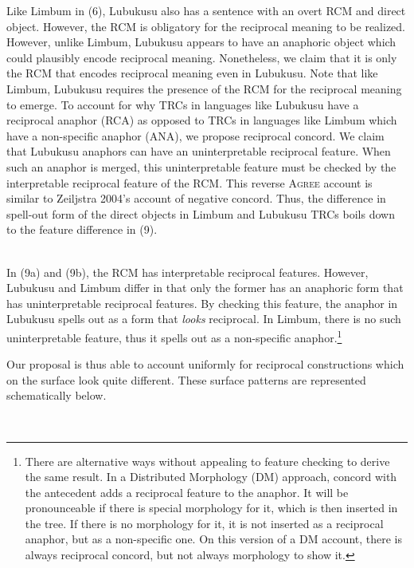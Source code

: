 \documentclass[output=paper]{langsci/langscibook}
\begin{document}
Like Limbum in (6), Lubukusu also has a sentence with an overt RCM and direct object. However, the RCM is obligatory for the reciprocal meaning to be realized. However, unlike Limbum, Lubukusu appears to have an anaphoric object which could plausibly encode reciprocal meaning. Nonetheless, we claim that it is only the RCM that encodes reciprocal meaning even in Lubukusu. Note that like Limbum, Lubukusu requires the presence of the RCM for the reciprocal meaning to emerge. To account for why TRCs in languages like Lubukusu have a reciprocal anaphor (RCA) as opposed to TRCs in languages like Limbum which have a non-specific anaphor (ANA), we propose reciprocal concord. We claim that Lubukusu anaphors can have an uninterpretable reciprocal feature. When such an anaphor is merged, this uninterpretable feature must be checked by the interpretable reciprocal feature of the RCM. This reverse \textsc{Agree} account is similar to Zeiljstra 2004's account of negative concord. Thus, the difference in spell-out form of the direct objects in Limbum and Lubukusu TRCs boils down to the feature difference in (9).


\ea\label{ex:}
\\


In (9a) and (9b), the RCM has interpretable reciprocal features. However, Lubukusu and Limbum differ in that only the former has an anaphoric form that has uninterpretable reciprocal features. By checking this feature, the anaphor in Lubukusu spells out as a form that \textit{looks} reciprocal. In Limbum, there is no such uninterpretable feature, thus it spells out as a non-specific anaphor.\footnote{ There are alternative ways without appealing to feature checking to derive the same result. In a Distributed Morphology (DM) approach, concord with the antecedent adds a reciprocal feature to the anaphor. It will be pronounceable if there is special morphology for it, which is then inserted in the tree. If there is no morphology for it, it is not inserted as a reciprocal anaphor, but as a non-specific one. On this version of a DM account, there is always reciprocal concord, but not always morphology to show it.} 

  Our proposal is thus able to account uniformly for reciprocal constructions which on the surface look quite different. These surface patterns are represented schematically below.


\ea\label{ex:}
\\
\end{document}
